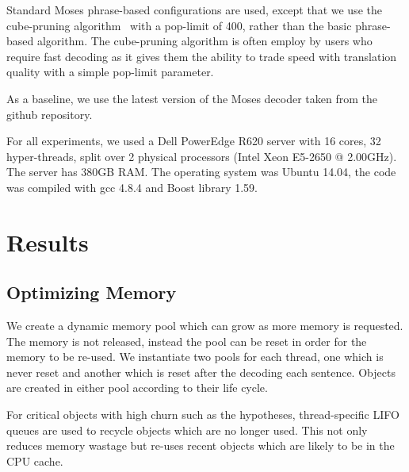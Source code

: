\documentclass[11pt]{article}
\begin{document}
Standard Moses phrase-based configurations are used, except that we use the cube-pruning algorithm~\cite{Chiang:2007:cl} with a pop-limit of 400, rather than the basic phrase-based algorithm. The cube-pruning algorithm is often employ by users who require fast decoding as it gives them the ability to trade speed with translation quality with a simple pop-limit parameter.

As a baseline, we use the latest version of the Moses decoder taken from the github repository.

For all experiments, we used a Dell PowerEdge R620 server with 16 cores, 32 hyper-threads, split over 2 physical processors (Intel Xeon E5-2650 @ 2.00GHz). The server has 380GB RAM. The operating system was Ubuntu 14.04, the code was compiled with gcc 4.8.4 and Boost library 1.59.

\section{Results}

\subsection{Optimizing Memory}

We create a dynamic memory pool which can grow as more memory is requested. The memory is not released, instead the pool can be reset in order for the memory to be re-used. We instantiate two pools for each thread, one which is never reset and another which is reset after the decoding each sentence. Objects are created in either pool according to their life cycle.

For critical objects with high churn such as the hypotheses, thread-specific LIFO queues are used to recycle objects which are no longer used. This not only reduces memory wastage but re-uses recent objects which are likely to be in the CPU cache.
\end{document}
